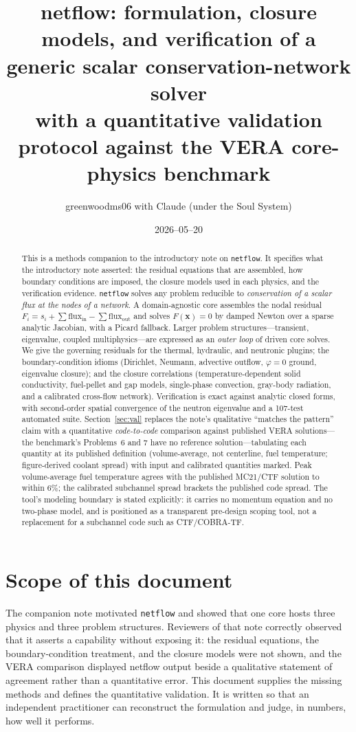 \documentclass[11pt]{article}
\title{\textbf{netflow}: formulation, closure models, and verification of a
generic scalar conservation-network solver\\
\large with a quantitative validation protocol against the VERA core-physics benchmark}
\author{greenwoodms06 \quad with Claude (under the Soul System)}
\date{2026--05--20}
\begin{document}
\maketitle

\begin{abstract}
\noindent
This is a methods companion to the introductory note on \texttt{netflow}. It
specifies what the introductory note asserted: the residual equations that are
assembled, how boundary conditions are imposed, the closure models used in each
physics, and the verification evidence. \texttt{netflow} solves any problem
reducible to \emph{conservation of a scalar flux at the nodes of a network}.
A domain-agnostic core assembles the nodal residual $F_i = s_i + \sum
\text{flux}_\text{in} - \sum \text{flux}_\text{out}$ and solves $F(\mathbf{x})=0$
by damped Newton over a sparse analytic Jacobian, with a Picard fallback. Larger
problem structures---transient, eigenvalue, coupled multiphysics---are expressed
as an \emph{outer loop} of driven core solves. We give the governing residuals
for the thermal, hydraulic, and neutronic plugins; the boundary-condition idioms
(Dirichlet, Neumann, advective outflow, $\varphi{=}0$ ground, eigenvalue
closure); and the closure correlations (temperature-dependent solid conductivity,
fuel-pellet and gap models, single-phase convection, gray-body radiation, and a
calibrated cross-flow network). Verification is exact against analytic closed
forms, with second-order spatial convergence of the neutron eigenvalue and a
107-test automated suite. Section~\ref{sec:val} replaces the note's qualitative
``matches the pattern'' claim with a quantitative \emph{code-to-code} comparison
against published VERA solutions---the benchmark's Problems~6 and 7 have no
reference solution---tabulating each quantity at its published definition
(volume-average, not centerline, fuel temperature; figure-derived coolant spread)
with input and calibrated quantities marked. Peak volume-average fuel temperature
agrees with the published MC21/CTF solution to within 6\%; the calibrated
subchannel spread brackets the published code spread. The tool's modeling
boundary is stated explicitly: it carries no momentum equation and no two-phase
model, and is positioned as a transparent pre-design scoping tool, not a
replacement for a subchannel code such as CTF/COBRA-TF.
\end{abstract}

\section{Scope of this document}
The companion note motivated \texttt{netflow} and showed that one core hosts
three physics and three problem structures. Reviewers of that note correctly
observed that it asserts a capability without exposing it: the residual
equations, the boundary-condition treatment, and the closure models were not
shown, and the VERA comparison displayed netflow output beside a qualitative
statement of agreement rather than a quantitative error. This document supplies
the missing methods and defines the quantitative validation. It is written so
that an independent practitioner can reconstruct the formulation and judge, in
numbers, how well it performs.
\end{document}
